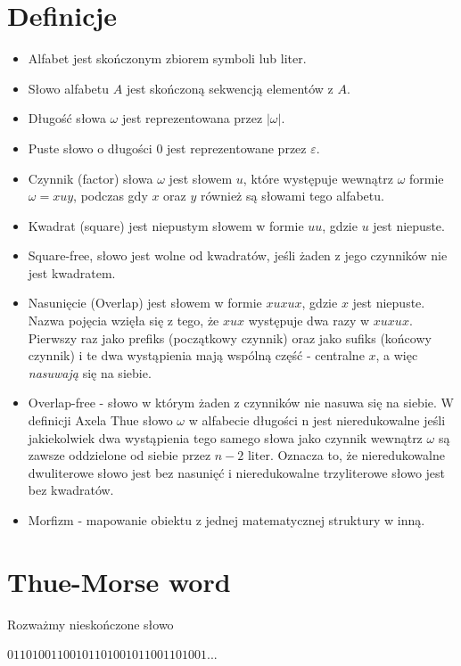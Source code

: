 \documentclass[document]{xmgr}
\begin{document}
\section{Definicje}
\begin{itemize}
\item Alfabet jest skończonym zbiorem symboli lub liter.
\item Słowo alfabetu $A$ jest skończoną sekwencją elementów z $A$. 
\item Długość słowa $\omega$ jest reprezentowana przez $|\omega|$.
\item Puste słowo o długości $0$ jest reprezentowane przez $\varepsilon$.
\item Czynnik (factor) słowa $\omega$ jest słowem $u$, które występuje wewnątrz $\omega$ formie $\omega = xuy$, podczas gdy $x$ oraz $y$ również są słowami tego alfabetu.
\item Kwadrat (square) jest niepustym słowem w formie $uu$, gdzie $u$ jest niepuste.
\item Square-free, słowo jest wolne od kwadratów, jeśli żaden z jego czynników nie jest kwadratem.
\item Nasunięcie (Overlap) jest słowem w formie $xuxux$, gdzie $x$ jest niepuste. Nazwa pojęcia wzięła się z tego, że $xux$ występuje dwa razy w $xuxux$. Pierwszy raz jako prefiks (początkowy czynnik) oraz jako sufiks (końcowy czynnik) i te dwa wystąpienia mają wspólną część - centralne $x$, a więc \textit{nasuwają} się na siebie.
\item Overlap-free - słowo w którym żaden z czynników nie nasuwa się na siebie.
W definicji Axela Thue słowo $\omega$ w alfabecie długości n jest nieredukowalne jeśli jakiekolwiek dwa wystąpienia tego samego słowa jako czynnik wewnątrz $\omega$ są zawsze oddzielone od siebie przez $n-2$ liter. Oznacza to, że nieredukowalne dwuliterowe słowo jest bez nasunięć i nieredukowalne trzyliterowe słowo jest bez kwadratów.
\item Morfizm - mapowanie obiektu z jednej matematycznej struktury w inną.
\end{itemize}



\section{Thue-Morse word}
Rozważmy nieskończone słowo

{\centering $01101001100101101001011001101001 ...$ \par}
\end{document}
